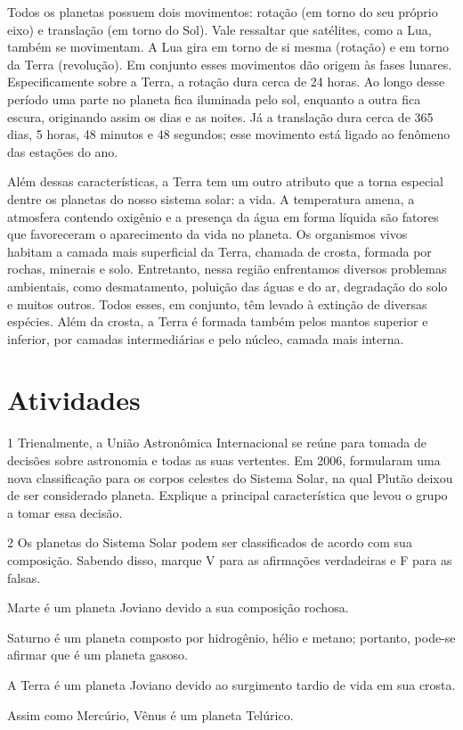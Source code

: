 {Todos os planetas possuem dois movimentos: rotação (em torno do seu
próprio eixo) e translação (em torno do Sol). Vale ressaltar que
satélites, como a Lua, também se movimentam. A Lua gira em torno de si
mesma (rotação) e em torno da Terra (revolução). Em conjunto esses
movimentos dão origem às fases lunares. Especificamente sobre a Terra, a
rotação dura cerca de 24 horas. Ao longo desse período uma parte no
planeta fica iluminada pelo sol, enquanto a outra fica escura,
originando assim os dias e as noites. Já a translação dura cerca de 365
dias, 5 horas, 48 minutos e 48 segundos; esse movimento está ligado ao fenômeno das estações do ano.

Além dessas características, a Terra tem um outro atributo que a torna
especial dentre os planetas do nosso sistema solar: a vida. A
temperatura amena, a atmosfera contendo oxigênio e a presença da água em
forma líquida são fatores que favoreceram o aparecimento da vida no
planeta. Os organismos vivos habitam a camada mais superficial da Terra,
chamada de crosta, formada por rochas, minerais e solo. Entretanto,
nessa região enfrentamos diversos problemas ambientais, como
desmatamento, poluição das águas e do ar, degradação do solo e muitos
outros. Todos esses, em conjunto, têm levado à extinção de diversas
espécies. Além da crosta, a Terra é formada também pelos mantos superior e
inferior, por camadas intermediárias e pelo núcleo, camada mais interna.}

\section*{Atividades}

\num{1}  Trienalmente, a União Astronômica Internacional se reúne para tomada
  de decisões sobre astronomia e todas as suas vertentes. Em 2006,
  formularam uma nova classificação para os corpos celestes do Sistema
  Solar, na qual Plutão deixou de ser considerado planeta. Explique a
  principal característica que levou o grupo a tomar essa decisão.



\num{2} Os planetas do Sistema Solar podem ser classificados de acordo com sua
  composição. Sabendo disso, marque V para as afirmações verdadeiras e F para as falsas.

\begin{boxlist}
 Marte é um planeta Joviano devido a sua composição rochosa.

 Saturno é um planeta composto por hidrogênio, hélio e metano;
portanto, pode-se afirmar que é um planeta gasoso.

 A Terra é um planeta Joviano devido ao surgimento tardio de vida em
sua crosta.

 Assim como Mercúrio, Vênus é um planeta Telúrico.
\end{boxlist}

